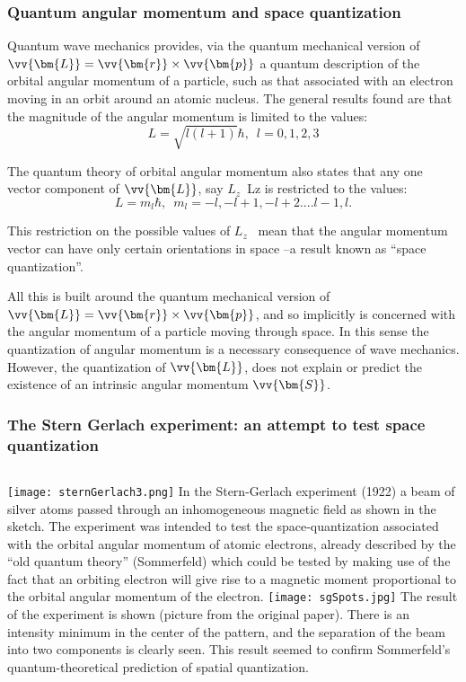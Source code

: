  \begin{frame}
\frametitle{Quantum angular momentum and space quantization}
 
Quantum wave mechanics provides, via the quantum mechanical version of 
$\vv{\bm{L}} = \vv{\bm{r}} \times \vv{\bm{p}}$
a quantum description of the orbital angular momentum of a particle, such as that associated with an electron moving in an orbit around an atomic nucleus. The general results found are that the magnitude of the angular momentum is limited to the values:
\[
L = \sqrt{l(l+1)}\hbar, \, \, \, l = 0,1,2,3
\]

The quantum theory of orbital angular momentum also states that any one vector component of 
$\vv{\bm{L}}$, say $L_z$~Lz  is restricted to the values:
\[
L = m_l\hbar, \, \, \, m_l = -l, -l+1, -l+2....l-1, l.
\]

This restriction on the possible values of $L_z$~ mean that the angular momentum vector can have only
certain orientations in space --a result known as ``space quantization''.

All this is built around the quantum mechanical version of $\vv{\bm{L}} = \vv{\bm{r}} \times \vv{\bm{p}}$, and so implicitly is concerned with the angular momentum of a particle moving through space. In this sense the quantization of angular momentum is a necessary consequence of wave mechanics. \alert{However, the quantization of $\vv{\bm{L}}$, does not explain or predict the existence of an intrinsic angular momentum
$\vv{\bm{S}}$}.
\end{frame}
\begin{frame}
\frametitle{The Stern Gerlach experiment: an attempt to test space quantization}
\begin{columns}
 
\texttt{[image: sternGerlach3.png]}
In the Stern-Gerlach experiment (1922) a beam of silver atoms passed through an inhomogeneous magnetic field as shown in the sketch. The experiment was intended to test the space-quantization associated with the orbital angular momentum of atomic electrons, already described by the ``old quantum theory'' (Sommerfeld) which could be tested by making use of the fact that an orbiting electron will give rise to a magnetic moment proportional to the orbital angular momentum of the electron. 
\texttt{[image: sgSpots.jpg]}
The result of the experiment is shown  (picture from the original paper). There is an intensity minimum in the center of the pattern, and the separation of the beam into two components is clearly seen. This result seemed to confirm Sommerfeld's quantum-theoretical prediction of spatial quantization. 
\end{columns}
\end{frame}
